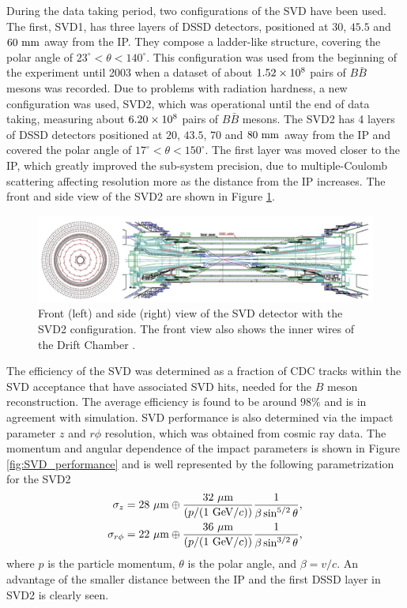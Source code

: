 During the data taking period, two configurations of the SVD have been used. The first, SVD1, has three layers of DSSD detectors, positioned at $30$, $45.5$ and $60\mathrm{~mm}$ away from the IP. They compose a ladder-like structure, covering the polar angle of $23^\circ < \theta < 140^\circ$. This configuration was used from the beginning of the experiment until 2003 when a dataset of about $1.52\times 10^{8}$ pairs of $B \bar B$ mesons was recorded. Due to problems with radiation hardness, a new configuration was used, SVD2, which was operational until the end of data taking, measuring about $6.20\times 10^{8}$ pairs of $B \bar B$ mesons. The SVD2 has 4 layers of DSSD detectors positioned at $20$, $43.5$, $70$ and $80\mathrm{~mm}$ away from the IP and covered the polar angle of $17^\circ < \theta < 150^\circ$. The first layer was moved closer to the IP, which greatly improved the sub-system precision, due to multiple-Coulomb scattering affecting resolution more as the distance from the IP increases. The front and side view of the SVD2 are shown in Figure \ref{fig:SVD_layout}.

\begin{figure}[H]
	\centering
	\captionsetup{width=0.8\linewidth}
	\includegraphics[width=\linewidth]{fig/setup/SVD_layout}
	\caption{Front (left) and side (right) view of the SVD detector with the SVD2 configuration. The front view also shows the inner wires of the
		Drift Chamber \cite{haba2004letter}.}
	\label{fig:SVD_layout}
\end{figure}

The efficiency of the SVD was determined as a fraction of CDC tracks within the SVD acceptance that have associated SVD hits, needed for the $B$ meson reconstruction. The average efficiency is found to be around $98\%$ and is in agreement with simulation. SVD performance is also determined via the impact parameter $z$ and $r\phi$ resolution, which was obtained from cosmic ray data. The momentum and angular dependence of the impact parameters is shown in Figure \ref{fig:SVD_performance} and is well represented by the following parametrization for the SVD2
\begin{align}
\sigma_z = 28\mathrm{~\mu m}\oplus \frac{32\mathrm{~\mu m}}{\left(p/(1\mathrm{~GeV}/c)\right)}\frac{1}{\beta \sin^{5/2}\theta},\\
\sigma_{r\phi} = 22\mathrm{~\mu m}\oplus \frac{36\mathrm{~\mu m}}{\left(p/(1\mathrm{~GeV}/c)\right)}\frac{1}{\beta \sin^{3/2}\theta},
\end{align}
where $p$ is the particle momentum, $\theta$ is the polar angle, and $\beta=v/c$. An advantage of the smaller distance between the IP and the first DSSD layer in SVD2 is clearly seen.

